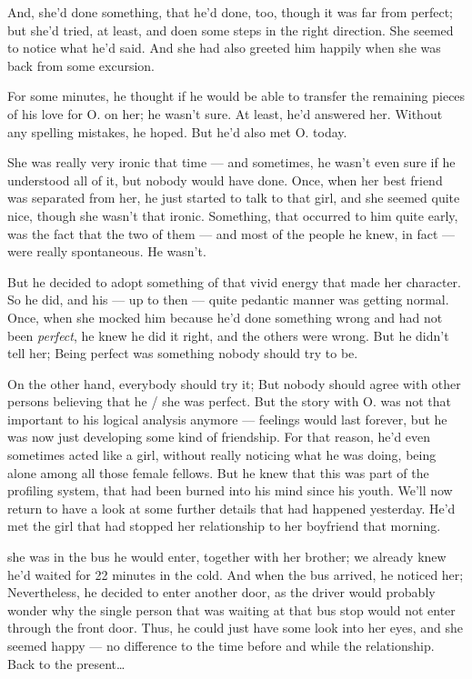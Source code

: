 And, she'd done something, that he'd done, too, though it was far from perfect; but she'd tried, at least, and doen some steps in the right direction. 
She seemed to notice what he'd said. 
And she had also greeted him happily when she was back from some excursion.

For some minutes, he thought if he would be able to transfer the remaining pieces of his love for O. on her; he wasn't sure. 
At least, he'd answered her. 
Without any spelling mistakes, he hoped. 
But he'd also met O. today.

She was really very ironic that time --- and sometimes, he wasn't even sure if he understood all of it, but nobody would have done. 
Once, when her best friend was separated from her, he just started to talk to that girl, and she seemed quite nice, though she wasn't that ironic. 
Something, that occurred to him quite early, was the fact that the two of them --- and most of the people he knew, in fact --- were really spontaneous. 
He wasn't.

But he decided to adopt something of that vivid energy that made her character. 
So he did, and his --- up to then --- quite pedantic manner was getting normal. 
Once, when she mocked him because he'd done something wrong and had not been \emph{perfect}, he knew he did it right, and the others were wrong. But he didn't tell her; Being perfect was something nobody should try to be.

On the other hand, everybody should try it; But nobody should agree with other persons believing that he / she was perfect. 
But the story with O. was not that important to his logical analysis anymore --- feelings would last forever, but he was now just developing some kind of friendship. 
For that reason, he'd even sometimes acted like a girl, without really noticing what he was doing, being alone among all those female fellows. 
But he knew that this was part of the profiling system, that had been burned into his mind since his youth. 
We'll now return to have a look at some further details that had happened yesterday. 
He'd met the girl that had stopped her relationship to her boyfriend that morning.

she was in the bus he would enter, together with her brother; we already knew he'd waited for 22 minutes in the cold. 
And when the bus arrived, he noticed her; Nevertheless, he decided to enter another door, as the driver would probably wonder why the single person that was waiting at that bus stop would not enter through the front door. 
Thus, he could just have some look into her eyes, and she seemed happy --- no difference to the time before and while the relationship.
Back to the present\dots{}

